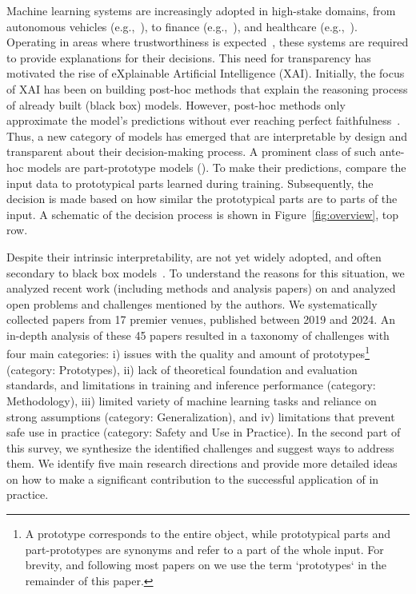 Machine learning systems are increasingly adopted in high-stake domains, from autonomous vehicles (e.g.,~\citealt{Liao_2024_CDSTraj}), to finance (e.g.,~\citealt{Zhou_2024_Astrategicanalysis}), and healthcare (e.g.,~\citealt{Eisemann_2025_Nationwiderealworldimplementation}). 
Operating in areas where trustworthiness is expected~\citep{Li_2023_Trustworthyai}, these systems are required to provide explanations for their decisions. This need for transparency has motivated the rise of eXplainable Artificial Intelligence (XAI). Initially, the focus of XAI has been on building post-hoc methods that explain the reasoning process of already built (black box) models. However, post-hoc methods only approximate the model's predictions without ever reaching perfect faithfulness~\citep{Rudin_2019_Stopexplainingblack}. Thus, a new category of models has emerged that are interpretable by design and transparent about their decision-making process. A prominent class of such ante-hoc models are part-prototype models (\ppms).
To make their predictions, \ppms compare the input data to prototypical parts learned during training. Subsequently, the decision is made based on how similar the prototypical parts are to parts of the input. A schematic of the decision process is shown in Figure~\ref{fig:overview}, top row.

Despite their intrinsic interpretability, \ppms are not yet widely adopted, and often secondary to black box models~\citep{Rudin_2019_Stopexplainingblack}. 
To understand the reasons for this situation, we analyzed recent work (including methods and analysis papers) on \ppms and analyzed open problems and challenges mentioned by the authors. We systematically collected papers from 17 premier venues, published between 2019 and 2024. 
An in-depth analysis of these 45 papers resulted in a taxonomy of challenges with four main categories: i) issues with the quality and amount of prototypes\footnote{A prototype corresponds to the entire object, while prototypical parts and part-prototypes are synonyms and refer to a part of the whole input. 
For brevity, and following most papers on \ppms we use the term `prototypes` in the remainder of this paper.} (category: Prototypes), ii) lack of theoretical foundation and evaluation standards, and limitations in training and inference performance (category: Methodology), iii) limited variety of machine learning tasks and reliance on strong assumptions (category: Generalization), and iv) limitations that prevent safe use in practice (category: Safety and Use in Practice).  
In the second part of this survey, we synthesize the identified challenges and suggest ways to address them. We identify five main research directions and provide more detailed ideas on how to make a significant contribution to the successful application of \ppms in practice.  

